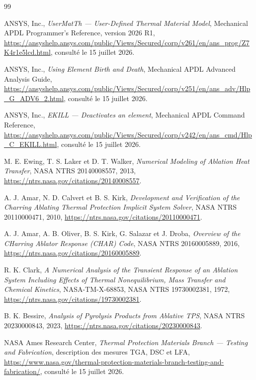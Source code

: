 \documentclass[oneside,openany]{amsdtx}
\begin{document}
\begin{thebibliography}{99}

ANSYS, Inc., \emph{UserMatTh --- User-Defined Thermal Material Model},
Mechanical APDL Programmer's Reference, version 2026 R1,
\url{https://ansyshelp.ansys.com/public/Views/Secured/corp/v261/en/ans_prog/Z7K4r1e5lcd.html},
consulté le 15 juillet 2026.

ANSYS, Inc., \emph{Using Element Birth and Death}, Mechanical APDL Advanced
Analysis Guide,
\url{https://ansyshelp.ansys.com/public/Views/Secured/corp/v251/en/ans_adv/Hlp_G_ADV6_2.html},
consulté le 15 juillet 2026.

ANSYS, Inc., \emph{EKILL --- Deactivates an element}, Mechanical APDL Command
Reference,
\url{https://ansyshelp.ansys.com/public/Views/Secured/corp/v242/en/ans_cmd/Hlp_C_EKILL.html},
consulté le 15 juillet 2026.

M. E. Ewing, T. S. Laker et D. T. Walker, \emph{Numerical Modeling of
Ablation Heat Transfer}, NASA NTRS 20140008557, 2013,
\url{https://ntrs.nasa.gov/citations/20140008557}.

A. J. Amar, N. D. Calvert et B. S. Kirk, \emph{Development and Verification of
the Charring Ablating Thermal Protection Implicit System Solver}, NASA NTRS
20110000471, 2010,
\url{https://ntrs.nasa.gov/citations/20110000471}.

A. J. Amar, A. B. Oliver, B. S. Kirk, G. Salazar et J. Droba,
\emph{Overview of the CHarring Ablator Response (CHAR) Code}, NASA NTRS
20160005889, 2016,
\url{https://ntrs.nasa.gov/citations/20160005889}.

R. K. Clark, \emph{A Numerical Analysis of the Transient Response of an
Ablation System Including Effects of Thermal Nonequilibrium, Mass Transfer and
Chemical Kinetics}, NASA-TM-X-68853, NASA NTRS 19730002381, 1972,
\url{https://ntrs.nasa.gov/citations/19730002381}.

B. K. Bessire, \emph{Analysis of Pyrolysis Products from Ablative TPS}, NASA
NTRS 20230000843, 2023,
\url{https://ntrs.nasa.gov/citations/20230000843}.

NASA Ames Research Center, \emph{Thermal Protection Materials Branch ---
Testing and Fabrication}, description des mesures TGA, DSC et LFA,
\url{https://www.nasa.gov/thermal-protection-materials-branch-testing-and-fabrication/},
consulté le 15 juillet 2026.


\end{thebibliography}
\end{document}
